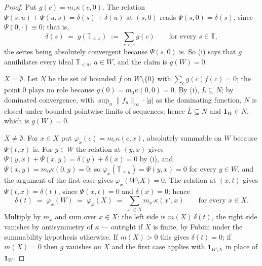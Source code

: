 \documentclass[11pt,a4paper]{article}
\theoremstyle{plain}
\theoremstyle{definition}
\theoremstyle{remark}
\newcommand{\T}{\mathbb{T}}                     %
\newcommand{\one}{\mathbf{1}}
\begin{document}
\begin{proof}
  Put $g(c) = m_c \kappa(c,0)$.  The relation
  $\Psi(s,u) + \Psi(u,s) = \delta(s) + \delta(u)$ at $(s,0)$ reads
  $\Psi(s,0) = \delta(s)$, since $\Psi(0,\cdot) \equiv 0$; that is,
  \[
    \delta(s) \;=\; g(\T_{<s}) \;:=\; \sum_{c < s} g(c)
    \qquad\text{for every } s \in \T ,
  \]
  the series being absolutely convergent because $\Psi(s,0)$ is.  So (i) says
  that $g$ annihilates every ideal $\T_{<a}$, $a \in W$, and the claim is
  $g(W) = 0$.

  \emph{$X = \emptyset$.}  Let $N$ be the set of bounded $f$ on
  $W \setminus \{0\}$ with $\sum_c g(c) f(c) = 0$; the point $0$ plays no role
  because $g(0) = m_0\kappa(0,0) = 0$.  By (i), $L \subseteq N$; by dominated
  convergence, with $\sup_n \lVert f_n \rVert_\infty \cdot \lvert g\rvert$ as
  the dominating function, $N$ is closed under bounded pointwise limits of
  sequences; hence $\overline{L} \subseteq N$ and $\one_W \in N$, which is
  $g(W) = 0$.

  \emph{$X \neq \emptyset$.}  For $x \in X$ put $\varphi_x(c) = m_c\kappa(c,x)$,
  absolutely summable on $W$ because $\Psi(t,x)$ is.  For $y \in W$ the
  relation at $(y,x)$ gives $\Psi(y,x) + \Psi(x,y) = \delta(y) + \delta(x) = 0$
  by (i), and $\Psi(x,y) = m_0 \kappa(0,y) = 0$; so
  $\varphi_x(\T_{<y}) = \Psi(y,x) = 0$ for every $y \in W$, and the argument of
  the first case gives $\varphi_x(W \setminus X) = 0$.  The relation at $(x,t)$
  gives $\Psi(t,x) = \delta(t)$, since $\Psi(x,t) = 0$ and $\delta(x) = 0$;
  hence
  \[
    \delta(t) \;=\; \varphi_x(W) \;=\; \varphi_x(X)
    \;=\; \sum_{x' \in X} m_{x'} \kappa(x',x)
    \qquad\text{for every } x \in X .
  \]
  Multiply by $m_x$ and sum over $x \in X$: the left side is
  $m(X)\,\delta(t)$, the right side vanishes by antisymmetry of $\kappa$ ---
  outright if $X$ is finite, by Fubini under the summability hypothesis
  otherwise.  If $m(X) > 0$ this gives $\delta(t) = 0$; if $m(X) = 0$ then $g$
  vanishes on $X$ and the first case applies with $\one_{W \setminus X}$ in
  place of $\one_W$.
\end{proof}
\end{document}
